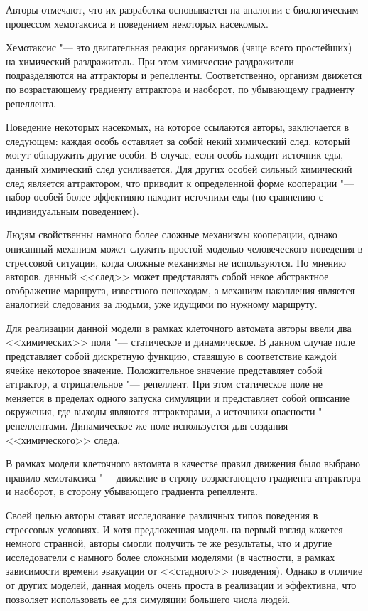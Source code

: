 Авторы отмечают, что их разработка основывается на аналогии с биологическим процессом хемотаксиса и поведением некоторых насекомых.

Хемотаксис "--- это двигательная реакция организмов (чаще всего простейших) на химический раздражитель.
При этом химические раздражители подразделяются на аттракторы и репелленты.
Соответственно, организм движется по возрастающему градиенту аттрактора и наоборот, по убывающему градиенту репеллента.

Поведение некоторых насекомых, на которое ссылаются авторы, заключается в следующем:
каждая особь оставляет за собой некий химический след, который могут обнаружить другие особи.
В случае, если особь находит источник еды, данный химический след усиливается.
Для других особей сильный химический след является аттрактором, что приводит к определенной форме кооперации "---
набор особей более эффективно находит источники еды (по сравнению с индивидуальным поведением).

Людям свойственны намного более сложные механизмы кооперации, однако описанный механизм может служить простой моделью человеческого поведения в стрессовой ситуации,
когда сложные механизмы не используются. По мнению авторов, данный <<след>> может представлять собой некое абстрактное отображение маршрута, известного пешеходам,
а механизм накопления является аналогией следования за людьми, уже идущими по нужному маршруту.

Для реализации данной модели в рамках клеточного автомата авторы ввели два <<химических>> поля "--- статическое и динамическое.
В данном случае поле представляет собой дискретную функцию, ставящую в соответствие каждой ячейке некоторое значение.
Положительное значение представляет собой аттрактор, а отрицательное "--- репеллент.
При этом статическое поле не меняется в пределах одного запуска симуляции и представляет собой описание окружения,
где выходы являются аттракторами, а источники опасности "--- репеллентами.
Динамическое же поле используется для создания <<химического>> следа.

В рамках модели клеточного автомата в качестве правил движения было выбрано правило хемотаксиса "---
движение в строну возрастающего градиента аттрактора и наоборот, в сторону убывающего градиента репеллента.

Своей целью авторы ставят исследование различных типов поведения в стрессовых условиях.
И хотя предложенная модель на первый взгляд кажется немного странной, авторы смогли получить те же результаты,
что и другие исследователи с намного более сложными моделями (в частности, в рамках зависимости времени эвакуации от <<стадного>> поведения).
Однако в отличие от других моделей, данная модель очень проста в реализации и эффективна, что позволяет использовать ее для симуляции большего числа людей.

